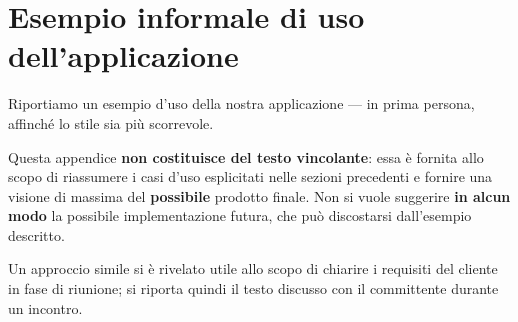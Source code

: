 \appendix
\section{Esempio informale di uso dell'applicazione }


Riportiamo un esempio d'uso della nostra applicazione --- in prima persona, affinché lo stile sia più scorrevole.

Questa appendice \textbf{non costituisce del testo vincolante}: essa è fornita allo scopo di riassumere i casi d'uso esplicitati nelle sezioni precedenti e fornire una visione di massima del \textbf{possibile} prodotto finale. Non si vuole suggerire \textbf{in alcun modo} la possibile implementazione futura, che può discostarsi dall'esempio descritto.

Un approccio simile si è rivelato utile allo scopo di chiarire i requisiti del cliente in fase di riunione; si riporta quindi il testo discusso con il committente durante un incontro.

